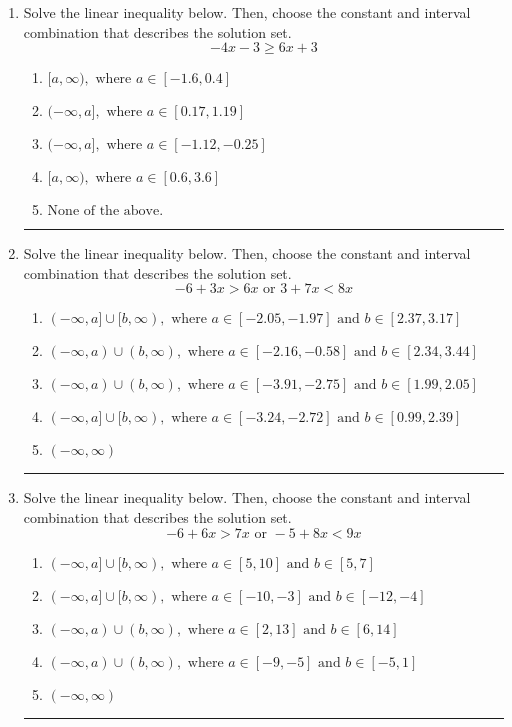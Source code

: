 \documentclass[14pt]{extbook}
\newcommand{\litem}[1]{\item#1\hspace*{-1cm}\rule{\textwidth}{0.4pt}}
\begin{document}
\begin{enumerate}
\litem{
Solve the linear inequality below. Then, choose the constant and interval combination that describes the solution set.\[ -4x -3 \geq 6x + 3 \]\begin{enumerate}[label=\Alph*.]
\item \( [a, \infty), \text{ where } a \in [-1.6, 0.4] \)
\item \( (-\infty, a], \text{ where } a \in [0.17, 1.19] \)
\item \( (-\infty, a], \text{ where } a \in [-1.12, -0.25] \)
\item \( [a, \infty), \text{ where } a \in [0.6, 3.6] \)
\item \( \text{None of the above}. \)

\end{enumerate} }
\litem{
Solve the linear inequality below. Then, choose the constant and interval combination that describes the solution set.\[ -6 + 3 x > 6 x \text{ or } 3 + 7 x < 8 x \]\begin{enumerate}[label=\Alph*.]
\item \( (-\infty, a] \cup [b, \infty), \text{ where } a \in [-2.05, -1.97] \text{ and } b \in [2.37, 3.17] \)
\item \( (-\infty, a) \cup (b, \infty), \text{ where } a \in [-2.16, -0.58] \text{ and } b \in [2.34, 3.44] \)
\item \( (-\infty, a) \cup (b, \infty), \text{ where } a \in [-3.91, -2.75] \text{ and } b \in [1.99, 2.05] \)
\item \( (-\infty, a] \cup [b, \infty), \text{ where } a \in [-3.24, -2.72] \text{ and } b \in [0.99, 2.39] \)
\item \( (-\infty, \infty) \)

\end{enumerate} }
\litem{
Solve the linear inequality below. Then, choose the constant and interval combination that describes the solution set.\[ -6 + 6 x > 7 x \text{ or } -5 + 8 x < 9 x \]\begin{enumerate}[label=\Alph*.]
\item \( (-\infty, a] \cup [b, \infty), \text{ where } a \in [5, 10] \text{ and } b \in [5, 7] \)
\item \( (-\infty, a] \cup [b, \infty), \text{ where } a \in [-10, -3] \text{ and } b \in [-12, -4] \)
\item \( (-\infty, a) \cup (b, \infty), \text{ where } a \in [2, 13] \text{ and } b \in [6, 14] \)
\item \( (-\infty, a) \cup (b, \infty), \text{ where } a \in [-9, -5] \text{ and } b \in [-5, 1] \)
\item \( (-\infty, \infty) \)


\end{enumerate}}
\end{enumerate}
\end{document}
